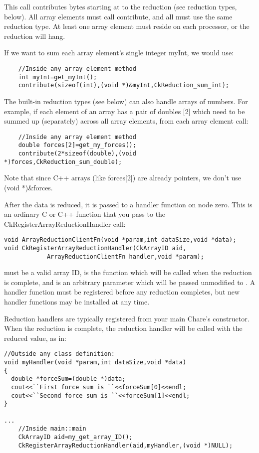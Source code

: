 This call contributes  bytes starting at  to the reduction  (see reduction types, below).  All array elements must call contribute, and all must use the same reduction type.  At least one array element must reside on each processor, or the reduction will hang.

If we want to sum each array element's single integer myInt, we would use:
\begin{verbatim}
    //Inside any array element method
    int myInt=get_myInt();
    contribute(sizeof(int),(void *)&myInt,CkReduction_sum_int);
\end{verbatim}

The built-in reduction types (see below) can also handle arrays of numbers.  For example, if each element of an array has a pair of doubles [2] which need to be summed up (separately) across all array elements, from each array element call:
\begin{verbatim}
    //Inside any array element method
    double forces[2]=get_my_forces();
    contribute(2*sizeof(double),(void *)forces,CkReduction_sum_double);
\end{verbatim}
Note that since C++ arrays (like forces[2]) are already pointers, we don't use (void *)\&forces.


After the data is reduced, it is passed to a handler function on node zero.  This is an ordinary C or C++ function that you pass to the CkRegisterArrayReductionHandler call:
\begin{verbatim}
void ArrayReductionClientFn(void *param,int dataSize,void *data);
void CkRegisterArrayReductionHandler(CkArrayID aid,
            ArrayReductionClientFn handler,void *param);
\end{verbatim}

 must be a valid array ID,  is the function which will be called when the reduction is complete, and  is an arbitrary parameter which will be passed unmodified to .  A handler function must be registered before any reduction completes, but new handler functions may be installed at any time.

Reduction handlers are typically registered from your main Chare's constructor.  When the reduction is complete, the reduction handler will be called with the reduced value, as in:
\begin{verbatim}
//Outside any class definition:
void myHandler(void *param,int dataSize,void *data)
{
  double *forceSum=(double *)data;
  cout<<``First force sum is ``<<forceSum[0]<<endl;
  cout<<``Second force sum is ``<<forceSum[1]<<endl;
}

...
    //Inside main::main
    CkArrayID aid=my_get_array_ID();
    CkRegisterArrayReductionHandler(aid,myHandler,(void *)NULL);
\end{verbatim}

